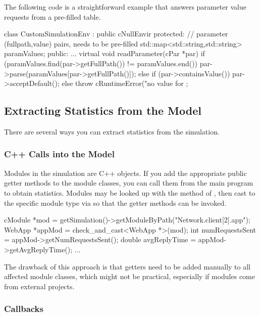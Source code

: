 The following code is a straightforward example that answers parameter
value requests from a pre-filled table.

\begin{cpp}
class CustomSimulationEnv : public cNullEnvir
{
  protected:
    // parameter (fullpath,value) pairs, needs to be pre-filled
    std::map<std::string,std::string> paramValues;
  public:
    ...
    virtual void readParameter(cPar *par) {
        if (paramValues.find(par->getFullPath()) != paramValues.end())
            par->parse(paramValues[par->getFullPath()]);
        else if (par->containsValue())
            par->acceptDefault();
        else
            throw cRuntimeError("no value for %
    }
};
\end{cpp}


\subsection{Extracting Statistics from the Model}
\label{sec:embedding:extracting-statistics}

There are several ways you can extract statistics from the
simulation.

\subsubsection{C++ Calls into the Model}
\label{sec:embedding:statistics-via-cpp-calls}

Modules in the simulation are C++ objects. If you add the appropriate
public getter methods to the module classes, you can call them from the
main program to obtain statistics. Modules may be looked up with the
 method of , then cast to the
specific module type via  so that the getter
methods can be invoked.

\begin{cpp}
cModule *mod = getSimulation()->getModuleByPath("Network.client[2].app");
WebApp *appMod = check_and_cast<WebApp *>(mod);
int numRequestsSent = appMod->getNumRequestsSent();
double avgReplyTime = appMod->getAvgReplyTime();
...
\end{cpp}

The drawback of this approach is that getters need to be added manually
to all affected module classes, which might not be practical, especially
if modules come from external projects.

\subsubsection{ Callbacks}
\label{sec:embedding:statistics-via-cenvir-callbacks}

